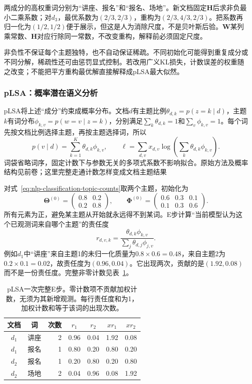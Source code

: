 两成分的高权重词分别为“讲座、报名”和“报名、场地”。新文档固定$\bm H$后求非负最小二乘系数；对$d_3$，最优系数为$(2/3,2/3)$，重构为$(2/3,4/3,2/3)$。把系数再归一化为$(1/2,1/2)$便于展示，但这是人为消除尺度，不是贝叶斯后验。$\bm W$某列乘常数、$\bm H$对应行除同一常数，不改变重构，解释前必须固定尺度。

非负性不保证每个主题独特，也不自动保证稀疏。不同初始化可能得到重复成分或不同分解，稀疏性还可由惩罚显式控制。若改用广义KL损失，计数误差的权重随之改变；不能把平方重构最优解直接解释成pLSA最大似然。

\subsubsection{pLSA：概率潜在语义分析}
\label{sec:nlp-classification-plsa}

pLSA将上述“成分”约束成概率分布。文档$d$有主题比例$\theta_{d,k}=p(z=k\mid d)$，主题$k$有词分布$\phi_{k,v}=p(w=v\mid z=k)$，分别满足$\sum_k\theta_{d,k}=1$和$\sum_v\phi_{k,v}=1$。每个词先按文档比例选择主题，再按主题选择词，所以
\[
 p(v\mid d)=\sum_{k=1}^{K}\theta_{d,k}\phi_{k,v},\qquad
 \ell=\sum_{d,v}x_{d,v}\log\!\left(\sum_k\theta_{d,k}\phi_{k,v}\right).
\]
词袋省略词序，固定计数下与参数无关的多项式系数不影响拟合。原始方法及概率结构见前卷；这里完整走通计数怎样变成文档主题结果

对式~\eqref{eq:nlp-classification-topic-counts}取两个主题，初始化为
\[
 \bm\Theta^{(0)}=
 \begin{pmatrix}0.8&0.2\\0.2&0.8\end{pmatrix},\qquad
 \bm\Phi^{(0)}=
 \begin{pmatrix}0.6&0.3&0.1\\0.1&0.3&0.6\end{pmatrix}.
\]
所有元素为正，避免某主题从开始就永远得不到某词。E步计算“当前模型认为这个已观测词来自哪个主题”的责任度
\[
 r_{d,v,k}=\frac{\theta_{d,k}\phi_{k,v}}
                   {\sum_j\theta_{d,j}\phi_{j,v}}.
\]
例如$d_1$中“讲座”来自主题1的未归一化质量为$0.8\times0.6=0.48$，来自主题2为$0.2\times0.1=0.02$，故责任度为$(0.96,0.04)$。它出现两次，贡献的是$(1.92,0.08)$而不是一份责任度。完整非零计数见表~\ref{tab:nlp-classification-plsa-em}。

\begin{table}[htbp]
 \centering
 \begin{tabular}{@{}ccrcccc@{}}
  \toprule
  文档 & 词 & 次数 & $r_1$ & $r_2$ & $x r_1$ & $x r_2$\\
  \midrule
  $d_1$ & 讲座 & 2 & 0.96 & 0.04 & 1.92 & 0.08\\
  $d_1$ & 报名 & 1 & 0.80 & 0.20 & 0.80 & 0.20\\
  $d_2$ & 报名 & 1 & 0.20 & 0.80 & 0.20 & 0.80\\
  $d_2$ & 场地 & 2 & 0.04 & 0.96 & 0.08 & 1.92\\
  \bottomrule
 \end{tabular}
 \caption{pLSA一次完整E步。零计数项不贡献加权计数，无须为其新增观测。每行责任度和为1，加权计数和等于该词的出现次数。}
 \label{tab:nlp-classification-plsa-em}
\end{table}

